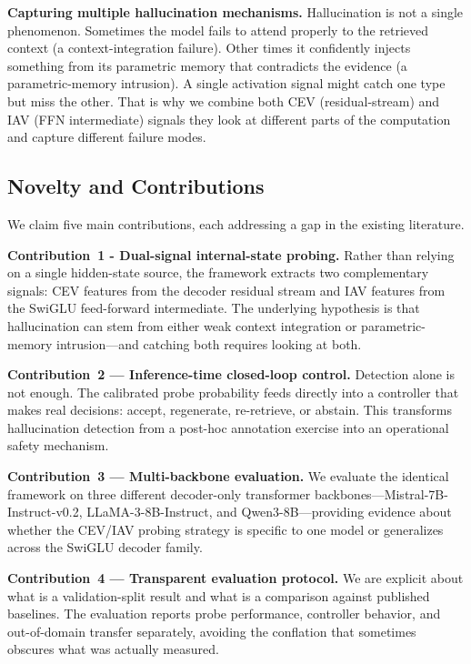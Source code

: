 \textbf{Capturing multiple hallucination mechanisms.} Hallucination is not a single phenomenon. Sometimes the model fails to attend properly to the retrieved context (a context-integration failure). Other times it confidently injects something from its parametric memory that contradicts the evidence (a parametric-memory intrusion). A single activation signal might catch one type but miss the other. That is why we combine both CEV (residual-stream) and IAV (FFN intermediate) signals they look at different parts of the computation and capture different failure modes.

\subsection{Novelty and Contributions}
\label{subsec:contributions}

We claim five main contributions, each addressing a gap in the existing literature.

\noindent\textbf{Contribution~1 - Dual-signal internal-state probing.} Rather than relying on a single hidden-state source, the framework extracts two complementary signals: CEV features from the decoder residual stream and IAV features from the SwiGLU feed-forward intermediate. The underlying hypothesis is that hallucination can stem from either weak context integration or parametric-memory intrusion—and catching both requires looking at both.

\noindent\textbf{Contribution~2 — Inference-time closed-loop control.} Detection alone is not enough. The calibrated probe probability feeds directly into a controller that makes real decisions: accept, regenerate, re-retrieve, or abstain. This transforms hallucination detection from a post-hoc annotation exercise into an operational safety mechanism.

\noindent\textbf{Contribution~3 — Multi-backbone evaluation.} We evaluate the identical framework on three different decoder-only transformer backbones—Mistral-7B-Instruct-v0.2, LLaMA-3-8B-Instruct, and Qwen3-8B—providing evidence about whether the CEV/IAV probing strategy is specific to one model or generalizes across the SwiGLU decoder family.

\noindent\textbf{Contribution~4 — Transparent evaluation protocol.} We are explicit about what is a validation-split result and what is a comparison against published baselines. The evaluation reports probe performance, controller behavior, and out-of-domain transfer separately, avoiding the conflation that sometimes obscures what was actually measured.

